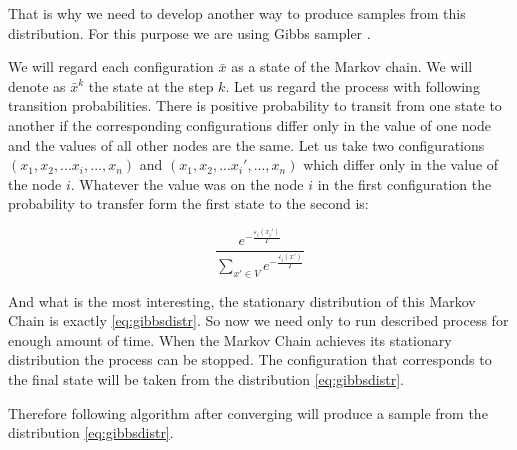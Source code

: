 \documentclass[12pt]{report}
\begin{document}
That is why we need to develop another way to produce samples from this distribution. For this purpose we are using Gibbs sampler \cite{bremaud2013markov}. 

We will regard each configuration $\bar{x}$ as a state of the Markov chain. We will denote as $ \bar{x}^k $ the state at the step $k$. Let us regard the process with following transition probabilities. There is positive probability to transit from one state to another if the corresponding configurations differ only in the value of one node and the values of all other nodes are the same. Let us take two configurations $(x_1, x_2, ... x_i, ..., x_n)$ and $(x_1, x_2, ... x_i', ..., x_n)$ which differ only in the value of the node $i$. Whatever the value was on the node $i$ in the first configuration the probability to transfer form the first state to the second is:

\begin{equation}
\label{eq:prob7}
\frac{ e^{-\frac{\varepsilon_i(x_i')}{T}} }{ \sum\limits_{x'\in V} e^{-\frac{\varepsilon_i(x')}{T}}}
\end{equation}


And what is the most interesting, the stationary distribution of this Markov Chain is exactly \ref{eq:gibbsdistr}. So now we need only to run described process for enough amount of time. When the Markov Chain achieves its stationary distribution the process can be stopped. The configuration that corresponds to the final state will be taken from the distribution \ref{eq:gibbsdistr}.

Therefore following algorithm after converging will produce a sample from the distribution \ref{eq:gibbsdistr}.
\end{document}
